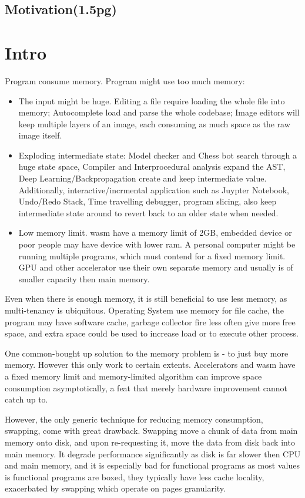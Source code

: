 \subsection{Motivation(1.5pg)}
\section{Intro}
Program consume memory. Program might use too much memory:
\begin{itemize}
	\item The input might be huge. Editing a file require loading the whole file into memory; Autocomplete load and parse the whole codebase; Image editors will keep multiple layers of an image, each consuming as much space as the raw image itself.
	\item Exploding intermediate state: Model checker and Chess bot search through a huge state space, Compiler and Interprocedural analysis expand the AST, Deep Learning/Backpropagation create and keep intermediate value. Additionally, interactive/incrmental application such as Juypter Notebook, Undo/Redo Stack, Time travelling debugger, program slicing, also keep intermediate state around to revert back to an older state when needed.
	\item Low memory limit. wasm have a memory limit of 2GB, embedded device or poor people may have device with lower ram. A personal computer might be running multiple programs, which must contend for a fixed memory limit. GPU and other accelerator use their own separate memory and usually is of smaller capacity then main memory.
\end{itemize}

Even when there is enough memory, it is still beneficial to use less memory, as multi-tenancy is ubiquitous. Operating System use memory for file cache, the program may have software cache, garbage collector fire less often give more free space, and extra space could be used to increase load or to execute other process.

One common-bought up solution to the memory problem is - to just buy more memory. However this only work to certain extents. Accelerators and wasm have a fixed memory limit and memory-limited algorithm can improve space consumption asymptotically, a feat that merely hardware improvement cannot catch up to. 

However, the only generic technique for reducing memory consumption, swapping, come with great drawback. Swapping move a chunk of data from main memory onto disk, and upon re-requesting it, move the data from disk back into main memory. It degrade performance significantly as disk is far slower then CPU and main memory, and it is especially bad for functional programs as most values is functional programs are boxed, they typically have less cache locality, exacerbated by swapping which operate on pages granularity.

